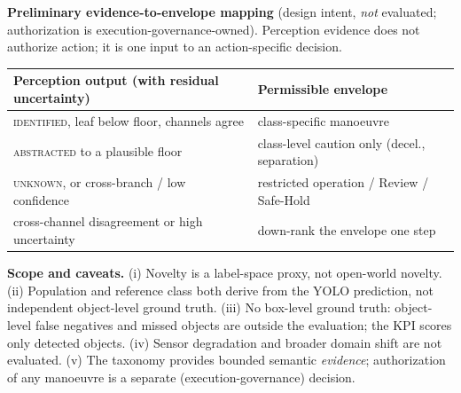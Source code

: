 \documentclass[10pt]{article}
\begin{document}
\textbf{Preliminary evidence-to-envelope mapping} (design intent, \emph{not}
evaluated; authorization is execution-governance-owned). Perception evidence does
not authorize action; it is one input to an action-specific decision.
\begin{center}
\begin{tabular}{@{}ll@{}}
\toprule
Perception output (with residual uncertainty) & Permissible envelope \\
\midrule
\textsc{identified}, leaf below floor, channels agree & class-specific manoeuvre \\
\textsc{abstracted} to a plausible floor & class-level caution only (decel., separation) \\
\textsc{unknown}, or cross-branch / low confidence & restricted operation / Review / Safe-Hold \\
cross-channel disagreement or high uncertainty & down-rank the envelope one step \\
\bottomrule
\end{tabular}
\end{center}

\textbf{Scope and caveats.} (i) Novelty is a label-space proxy, not open-world
novelty. (ii) Population and reference class both derive from the YOLO
prediction, not independent object-level ground truth. (iii) No box-level ground
truth: object-level false negatives and missed objects are outside the
evaluation; the KPI scores only detected objects. (iv) Sensor degradation and
broader domain shift are not evaluated. (v) The taxonomy provides bounded
semantic \emph{evidence}; authorization of any manoeuvre is a separate
(execution-governance) decision.
\end{document}
